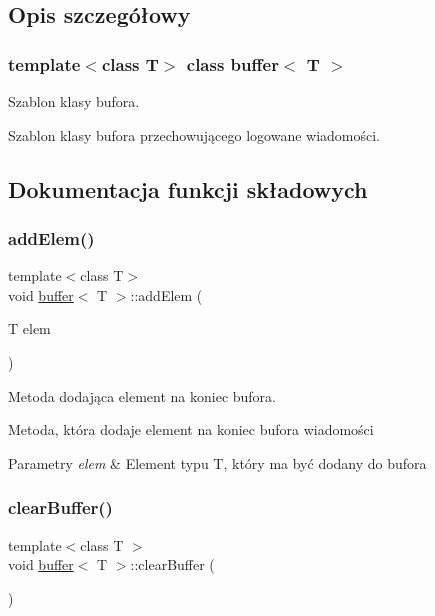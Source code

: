 \subsection{Opis szczegółowy}
\subsubsection*{template$<$class T$>$\newline
class buffer$<$ T $>$}

Szablon klasy bufora. 

Szablon klasy bufora przechowującego logowane wiadomości. 

\subsection{Dokumentacja funkcji składowych}
\mbox{\label{classbuffer_ac93ddd3a9a4bfbb30dc4df278cb51f8a}} 
\subsubsection{\texorpdfstring{add\+Elem()}{addElem()}}
{\footnotesize\ttfamily template$<$class T$>$ \\
void \hyperlink{classbuffer}{buffer}$<$ T $>$\+::add\+Elem (\begin{DoxyParamCaption}\item[{T}]{elem }\end{DoxyParamCaption})}



Metoda dodająca element na koniec bufora. 

Metoda, która dodaje element na koniec bufora wiadomości 
\begin{DoxyParams}{Parametry}
{\em elem} & Element typu T, który ma być dodany do bufora \\
\hline
\end{DoxyParams}
\mbox{\label{classbuffer_ab0d55e3e80f82ff361c9a6f14599fe19}} 
\subsubsection{\texorpdfstring{clear\+Buffer()}{clearBuffer()}}
{\footnotesize\ttfamily template$<$class T $>$ \\
void \hyperlink{classbuffer}{buffer}$<$ T $>$\+::clear\+Buffer (\begin{DoxyParamCaption}{ }\end{DoxyParamCaption})}



